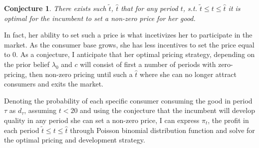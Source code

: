 \documentclass[13pt]{article}
\numberwithin{figure}{section}
\numberwithin{table}{section}
\theoremstyle{indented}
\newtheorem{conjecture}{Conjecture}[section]
\numberwithin{equation}{section} %
\begin{document}
\begin{conjecture}
There exists such $\tilde{t}$, $\hat{t}$ that for any period $t$, s.t. $\tilde{t} \leq t \leq \hat{t}$ it is optimal for the incumbent to set a non-zero price for her good. %
\end{conjecture}

In fact, her ability to set such a price is what incetivizes her to participate in the market. As the consumer base grows, she has less incentives to set the price equal to 0. As a conjecture, I anticipate that her optimal pricing strategy, depending on the prior belief $\lambda_0$ and $c$ will consist of first a number of periods with zero-pricing, then non-zero pricing until such a $\hat{t}$ where she can no longer attract consumers and exits the market.



Denoting the probability of each specific consumer consuming the good in period $\tau$ as $d_{\tau}$, assuming $t<20$ and using the conjecture that the incumbent will develop quality in any period she can set a non-zero price, I can express $\pi_t$, the profit in each period $\tilde{t} \leq t \leq \hat{t}$ through Poisson binomial distribution function and solve for the optimal pricing and development strategy. 


\end{document}
